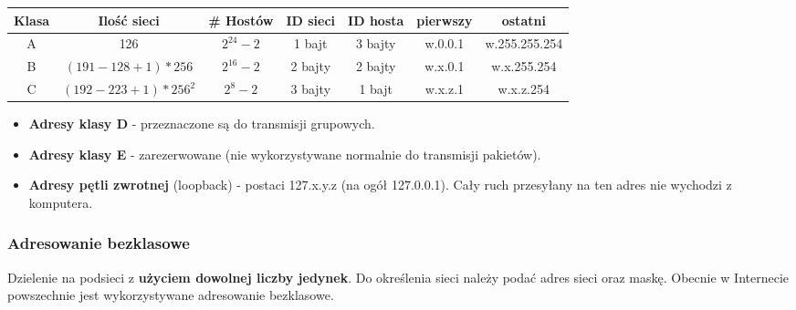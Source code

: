 \documentclass[main.tex]{subfiles}
\begin{document}
    \begin{table}[H]
        \begin{center}
            \begin{tabular}{|c|c|c|c|c|c|c|}
                \hline
                Klasa & Ilość sieci & \# Hostów & ID sieci & ID hosta & pierwszy & ostatni\\
                \hline
                A & 126 & $2^{24}-2$ & 1 bajt & 3 bajty & w.0.0.1 & w.255.255.254\\
                \hline
                B & $(191-128+1)*256$ & $2^{16}-2$ & 2 bajty & 2 bajty & w.x.0.1 & w.x.255.254\\
                \hline
                C & $(192-223+1)*256^2$ & $2^8-2$ & 3 bajty & 1 bajt & w.x.z.1 & w.x.z.254\\
                \hline
            \end{tabular}
        \end{center}
    \end{table}


    \begin{itemize}
        \item \textbf{Adresy klasy D} - przeznaczone są do transmisji grupowych.
        \item \textbf{Adresy klasy E} - zarezerwowane (nie wykorzystywane normalnie do transmisji pakietów).
        \item \textbf{Adresy pętli zwrotnej} (loopback) - postaci 127.x.y.z (na ogół 127.0.0.1). Cały ruch przesyłany na ten adres nie wychodzi z komputera.
    \end{itemize}


    \subsubsection{Adresowanie bezklasowe}
    Dzielenie na podsieci z \textbf{użyciem dowolnej liczby jedynek}. Do określenia sieci należy podać adres
    sieci oraz maskę. Obecnie w Internecie powszechnie jest wykorzystywane adresowanie
    bezklasowe.
\end{document}
